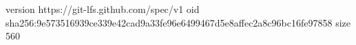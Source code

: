 version https://git-lfs.github.com/spec/v1
oid sha256:9e573516939ce339e42cad9a33fe96e6499467d5e8affec2a8c96bc16fe97858
size 560
